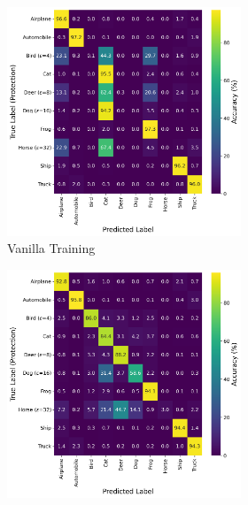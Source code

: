 \documentclass[conference]{IEEEtran}
\theoremstyle{definition}
\theoremstyle{remark}
\theoremstyle{proposition}
\begin{document}
\begin{figure}[tb!]
    \ContinuedFloat
    \begin{subfigure}{1.0\textwidth}
    \centering
        \begin{subfigure}{.40\textwidth}
    		\centering
    		\includegraphics[width=1.0\textwidth]{combination_attacks/ResNet18_REM_eps_combo_t_0_confusion_matrix.png}
            \caption*{Vanilla Training}
    	\end{subfigure}
     \hspace{5em}
        \begin{subfigure}{.40\textwidth}
    		\centering
    		\includegraphics[width=1.0\textwidth]{combination_attacks/ResNet18_REM_eps_combo_t_200_confusion_matrix.png}

\end{subfigure}
\end{subfigure}
\end{figure}
\end{document}
